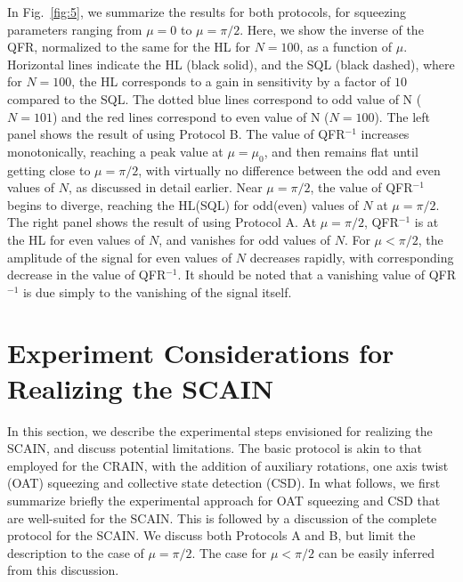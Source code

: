 \documentclass[aps,pra,letterpaper,superscriptaddress,showpacs,amsmath,floats,twocolumn]{revtex4-1}
\begin{document}
In Fig.~\ref{fig:5}, we summarize the results for both protocols, for squeezing parameters ranging from $\mu=0$ to $\mu=\pi/2$. Here, we show the inverse of the QFR, normalized to the same for the HL for $N = 100$, as a function of $\mu$. Horizontal lines indicate the HL (black solid), and the SQL (black dashed), where for $N=100$, the HL corresponds to a gain in sensitivity by a factor of $10$ compared to the SQL. The dotted blue lines correspond to odd value of N ($N=101$) and the red lines correspond to even value of N ($N = 100$). The left panel shows the result of using Protocol B. The value of QFR$^{-1}$ increases monotonically, reaching a peak value at $\mu=\mu_0$, and then remains flat until getting close to $\mu=\pi/2$, with virtually no difference between the odd and even values of $N$, as discussed in detail earlier. Near $\mu= \pi/2$, the value of QFR$^{-1}$ begins to diverge, reaching the HL(SQL) for odd(even) values of $N$ at $\mu=\pi/2$. The right panel shows the result of using Protocol A. At $\mu=\pi/2$, QFR$^{-1}$ is at the HL for even values of $N$, and vanishes for odd values of $N$. For $\mu < \pi/2$, the amplitude of the signal for even values of $N$ decreases rapidly, with corresponding decrease in the value of QFR$^{-1}$. It should be noted that a vanishing value of QFR$^{-1}$ is due simply to the vanishing of the signal itself.



\section{Experiment Considerations for Realizing the SCAIN}
\label {Experiment}

In this section, we describe the experimental steps envisioned for realizing the SCAIN, and discuss potential limitations. The basic protocol is akin to that employed for the CRAIN, with the addition of auxiliary rotations, one axis twist (OAT) squeezing and collective state detection (CSD). In what follows, we first summarize briefly the experimental approach for OAT squeezing and CSD that are well-suited for the SCAIN. This is followed by a discussion of the complete protocol for the SCAIN. We discuss both Protocols A and B, but limit the description to the case of $\mu=\pi/2$. The case for $\mu<\pi/2$ can be easily inferred from this discussion. 
\end{document}
